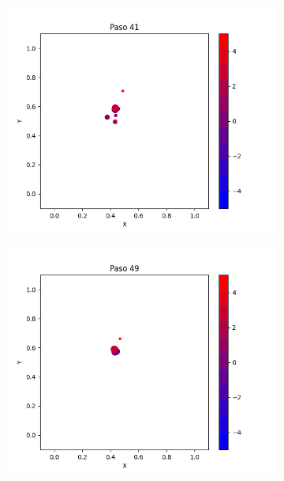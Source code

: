 \documentclass{report}
\begin{document}
\begin{figure}[h]
\begin{subfigure}[b]{0.3\textwidth}
         \includegraphics[width=\textwidth]{Images/Images_mc/p9pmc_t41.png}
     \end{subfigure}
     \begin{subfigure}[b]{0.3\textwidth}
         \centering
         \includegraphics[width=\textwidth]{Images/Images_mc/p9pmc_t49.png}
     \end{subfigure}
     \begin{subfigure}[b]{0.3\textwidth}
         \centering

\end{subfigure}
\end{figure}
\end{document}
